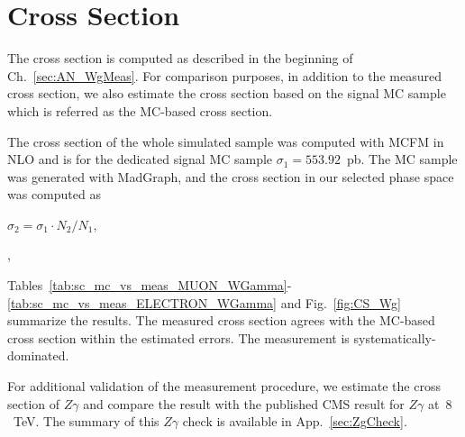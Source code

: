 \section{Cross Section}
\label{sec:AN_CrossSection}

The cross section is computed as described in the beginning of Ch.~\ref{sec:AN_WgMeas}. For comparison purposes, in addition to the measured cross section, we also estimate the cross section based on the signal MC sample which is referred as the MC-based cross section.


The cross section of the whole simulated sample was computed with MCFM in NLO and is for the dedicated signal MC sample $\sigma_1=553.92$~pb. The MC sample was generated with MadGraph, and the cross section in our selected phase space was computed as 

\begin{center}
$\sigma_2 = \sigma_1 \cdot N_2 / N_1$, 
\end{center} 


\begin{center}
, 
\end{center} 


Tables~\ref{tab:sc_mc_vs_meas_MUON_WGamma}-\ref{tab:sc_mc_vs_meas_ELECTRON_WGamma} and Fig.~\ref{fig:CS_Wg} summarize the results. The measured cross section agrees with the MC-based cross section within the estimated errors. The measurement is systematically-dominated. 

For additional validation of the measurement procedure, we estimate the cross section of $Z\gamma$ and compare the result with the published CMS result for $Z\gamma$ at~$8$~TeV. The summary of this $Z\gamma$ check is available in App.~\ref{sec:ZgCheck}.


